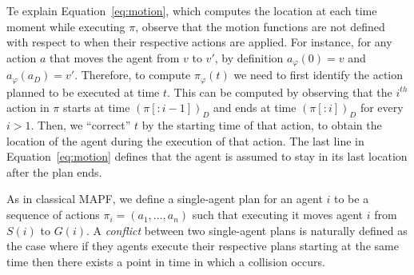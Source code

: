 \documentclass[review]{elsarticle}
\newcommand{\target}{\ensuremath{G}\xspace}
\newcommand{\source}{\ensuremath{S}\xspace}
\newcommand\konstantin[1]{\nb{\textbf{Konstantin:}}{red}{#1}}
\newcommand\roni[1]{\nb{\textbf{Roni:}}{green}{#1}}
\newcommand{\mapf}{\ac{MAPF}\xspace}
\begin{document}

Te explain Equation~\ref{eq:motion}, which computes the location at each time moment while executing $\pi$, observe that the motion functions are not defined with respect to when their respective actions are applied. For instance, for any action $a$ that moves the agent from $v$ to $v'$, by definition $a_\varphi(0)=v$ and $a_\varphi(a_D)=v'$.
Therefore, to compute $\pi_\varphi(t)$ we need to first identify the action planned to be executed at time $t$. 
This can be computed by observing that the $i^{th}$ action in $\pi$ starts at time $(\pi[:i-1])_D$ and ends at time $(\pi[:i])_D$ for every $i>1$. 
Then, we ``correct'' $t$ by the starting time of that action, to obtain the location of the agent during the execution of that action. 
The last line in Equation~\ref{eq:motion} defines that the agent is assumed to stay in its last location after the plan ends. 





As in classical \mapf, we define a single-agent plan for an agent $i$ to be a sequence of actions $\pi_i=(a_1,\ldots, a_n)$ 
such that executing it moves agent $i$ from $\source(i)$ to $\target(i)$. 
A \emph{conflict} between two single-agent plans is naturally defined as the case where if they agents execute their respective plans starting at the same time then there exists a point in time in which a collision occurs. 
\end{document}
